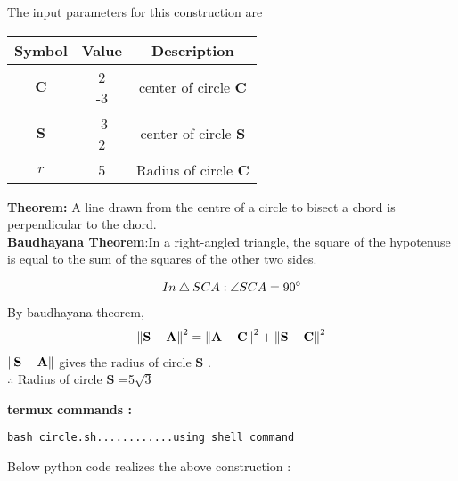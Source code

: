 \documentclass[10pt, a4paper]{article}
\newcommand{\myvec}[1]{\ensuremath{\begin{pmatrix}#1\end{pmatrix}}}
\let\vec\mathbf
\begin{document}
    The input parameters for this construction are
\begin{center}
\begin{tabular}{|c|c|c|}
	\hline
	\textbf{Symbol}&\textbf{Value}&\textbf{Description}\\
	\hline
	$\vec{C}$ &\myvec{2\\-3}&center of circle $\vec{C}$\\
	\hline
    $\vec{S}$ &\myvec{-3\\2}&center of circle $\vec{S}$ \\
	\hline
    $r$ & 5 &Radius of circle $\vec{C}$\\
	\hline
\end{tabular}
\end{center}
\textbf{Theorem:}
A line drawn from the centre of a circle to bisect a chord is perpendicular to the chord.\\

\textbf{Baudhayana Theorem}:In a right-angled triangle, the square of the hypotenuse is equal to the sum of the squares of the other two sides.

\begin{align}
  In   \bigtriangleup SCA:  \angle SCA= 90\degree
\end{align}
By baudhayana theorem,
\begin{align}
 \norm{\vec{S}-\vec{A}}^{2}=\norm{\vec{A}-\vec{C}}^{2}+\norm{\vec{S}-\vec{C}}^{2}
\end{align}
 $\norm{\vec{S}-\vec{A}}$ gives the radius of circle $\vec{S}$ .\\
 $\therefore$ Radius of circle $\vec{S}$ =5$\sqrt{3}$






\textbf{termux commands :}
\begin{lstlisting}
bash circle.sh............using shell command
\end{lstlisting}
\begin{center}
Below python code realizes the above construction :
\end{center}
\end{document}
